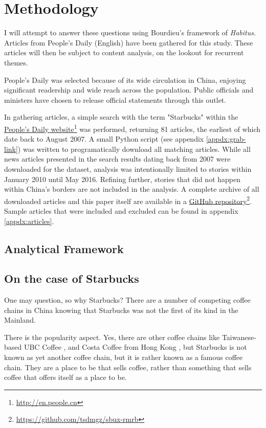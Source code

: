 \chapter{Methodology}\label{chap:methodology}

I will attempt to answer these questions using Bourdieu's framework of
\emph{Habitus}. Articles from People's Daily (English) have been gathered for
this study. These articles will then be subject to content analysis, on the
lookout for recurrent themes.

People's Daily was selected because of its wide circulation in China, enjoying
significant readership and wide reach across the population. Public officials
and ministers have chosen to release official statements through this outlet.

In gathering articles, a simple search with the term "Starbucks" within the
\href{http://en.people.cn}{People's Daily
website}\footnote{\url{http://en.people.cn}} was performed, returning 81
articles, the earliest of which date back to August 2007. A small Python script
(see appendix \autoref{appdx:grab-link}) was written to programatically download
all matching articles. While all news articles presented in the search results
dating back from 2007 were downloaded for the dataset, analysis was
intentionally limited to stories within January 2010 until May 2016. Refining
further, stories that did not happen within China's borders are not included in
the analysis. A complete archive of all downloaded articles and this paper
itself are available in a \href{https://github.com/tsdmgz/sbux-rmrb}{GitHub
repository}\footnote{\url{https://github.com/tsdmgz/sbux-rmrb}}. Sample articles
that were included and excluded can be found in appendix \ref{appdx:articles}.

\section{Analytical Framework}\label{sec:analyticf}


\section{On the case of Starbucks}\label{sec:case-of-sbux}

One may question, so why Starbucks? There are a number of competing coffee
chains in China knowing that Starbucks was not the first of its kind in the
Mainland.

There is the popularity aspect. Yes, there are other coffee chains like
Taiwanese-based UBC
Coffee \autocite{CITEME}, and Costa Coffee from Hong Kong \autocite{CITEME}, but
Starbucks is not known as yet another coffee chain, but it is rather known as a
famous coffee chain. They are a place to be that sells coffee, rather than
something that sells coffee that offers itself as a place to be.

